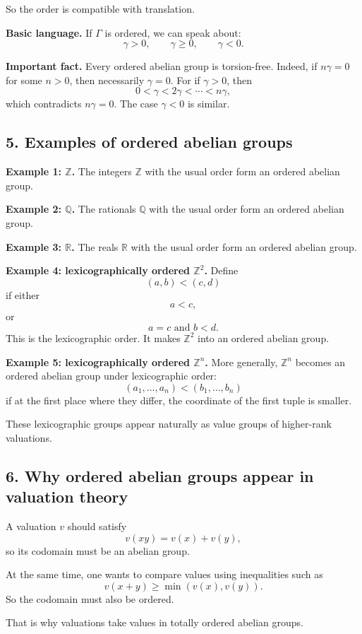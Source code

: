 \documentclass[12pt,a4paper]{article}
\theoremstyle{notespace}
\begin{document}
So the order is compatible with translation.

\textbf{Basic language.}
If \(\Gamma\) is ordered, we can speak about:
\[
\gamma>0,\qquad \gamma\ge 0,\qquad \gamma<0.
\]

\textbf{Important fact.}
Every ordered abelian group is torsion-free. Indeed, if \(n\gamma=0\) for some \(n>0\), then necessarily \(\gamma=0\). For if \(\gamma>0\), then
\[
0<\gamma<2\gamma<\cdots<n\gamma,
\]
which contradicts \(n\gamma=0\). The case \(\gamma<0\) is similar.

\subsection{5. Examples of ordered abelian groups}

\textbf{Example 1: \(\mathbb Z\).}
The integers \(\mathbb Z\) with the usual order form an ordered abelian group.

\textbf{Example 2: \(\mathbb Q\).}
The rationals \(\mathbb Q\) with the usual order form an ordered abelian group.

\textbf{Example 3: \(\mathbb R\).}
The reals \(\mathbb R\) with the usual order form an ordered abelian group.

\textbf{Example 4: lexicographically ordered \(\mathbb Z^2\).}
Define
\[
(a,b) < (c,d)
\]
if either
\[
a<c,
\]
or
\[
a=c \text{ and } b<d.
\]
This is the lexicographic order. It makes \(\mathbb Z^2\) into an ordered abelian group.

\textbf{Example 5: lexicographically ordered \(\mathbb Z^n\).}
More generally, \(\mathbb Z^n\) becomes an ordered abelian group under lexicographic order:
\[
(a_1,\dots,a_n) < (b_1,\dots,b_n)
\]
if at the first place where they differ, the coordinate of the first tuple is smaller.

These lexicographic groups appear naturally as value groups of higher-rank valuations.

\subsection{6. Why ordered abelian groups appear in valuation theory}

A valuation \(v\) should satisfy
\[
v(xy)=v(x)+v(y),
\]
so its codomain must be an abelian group.

At the same time, one wants to compare values using inequalities such as
\[
v(x+y)\ge \min(v(x),v(y)).
\]
So the codomain must also be ordered.

That is why valuations take values in totally ordered abelian groups.
\end{document}
